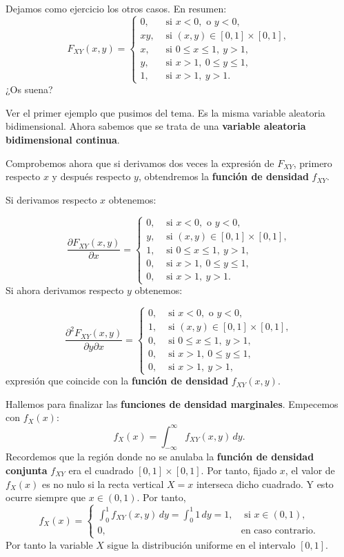 \documentclass[]{book}
\begin{document}
Dejamos como ejercicio los otros casos. En resumen:
\[
F_{XY}(x,y)=\begin{cases}
0, & \mbox{ si }x<0, \mbox{ o }y<0,\\
x y, & \mbox{ si }(x,y)\in [0,1]\times [0,1],\\
x, & \mbox{ si }0\leq x\leq 1,\ y>1,\\
y, & \mbox{ si }x>1,\ 0\leq y\leq 1,\\
1, & \mbox{ si } x>1,\ y>1.
\end{cases}
\]
¿Os suena?

Ver el primer ejemplo que pusimos del tema. Es la misma variable aleatoria bidimensional.
Ahora sabemos que se trata de una \textbf{variable aleatoria bidimensional continua}.

Comprobemos ahora que si derivamos dos veces la expresión de \(F_{XY}\), primero respecto \(x\) y después respecto \(y\), obtendremos la \textbf{función de densidad} \(f_{XY}\).

Si derivamos respecto \(x\) obtenemos:

\[
\frac{\partial F_{XY}(x,y)}{\partial x}=\begin{cases}
0, & \mbox{ si }x<0, \mbox{ o }y<0,\\
y, & \mbox{ si }(x,y)\in [0,1]\times [0,1],\\
1, & \mbox{ si }0\leq x\leq 1,\ y>1,\\
0, & \mbox{ si }x>1,\ 0\leq y\leq 1,\\
0, & \mbox{ si } x>1,\ y>1.
\end{cases}
\]
Si ahora derivamos respecto \(y\) obtenemos:

\[
\frac{\partial^2 F_{XY}(x,y)}{\partial y\partial x}=\begin{cases}
0, & \mbox{ si }x<0, \mbox{ o }y<0,\\
1, & \mbox{ si }(x,y)\in [0,1]\times [0,1],\\
0, & \mbox{ si }0\leq x\leq 1,\ y>1,\\
0, & \mbox{ si }x>1,\ 0\leq y\leq 1,\\
0, & \mbox{ si } x>1,\ y>1,
\end{cases}
\]
expresión que coincide con la \textbf{función de densidad} \(f_{XY}(x,y)\).

Hallemos para finalizar las \textbf{funciones de densidad marginales}. Empecemos con \(f_X(x)\):
\[
f_X(x)=\int_{-\infty}^\infty  f_{XY}(x,y)\, dy.
\]
Recordemos que la región donde no se anulaba la \textbf{función de densidad conjunta} \(f_{XY}\) era el cuadrado \([0,1]\times [0,1]\). Por tanto, fijado \(x\), el valor de \(f_X(x)\) es no nulo si la recta vertical \(X=x\) interseca dicho cuadrado. Y esto ocurre siempre que \(x\in (0,1)\). Por tanto,
\[
f_X(x)=\begin{cases}
\int_{0}^1  f_{XY}(x,y)\, dy=\int_{0}^1  1\, dy=1, & \mbox{ si }x\in (0,1),\\
0, & \mbox{en caso contrario.}
\end{cases}
\]
Por tanto la variable \(X\) sigue la distribución uniforme en el intervalo \([0,1]\).
\end{document}
